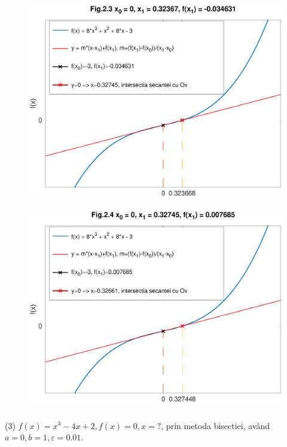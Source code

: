 \documentclass[12pt]{article}
\begin{document}
\begin{figure}[htbp]
    \begin{center}
        \includegraphics[height=90mm]{octave-fig/Fig.2.3.eps}
        \includegraphics[height=90mm]{octave-fig/Fig.2.4.eps}
    \end{center}
\end{figure}
\newpage

(3) $f(x)=x^3-4x+2, f(x)=0, x=?$, prin metoda bisectiei, având $a=0, b=1, \varepsilon=0.01$.\\
\end{document}
